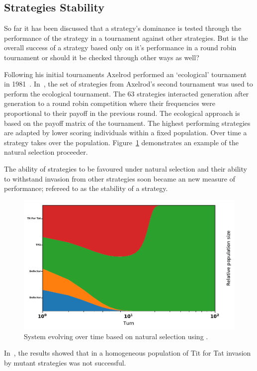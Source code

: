 \documentclass{article}
\begin{document}
\subsection{Strategies Stability}

So far it has been discussed that a strategy's dominance is tested through
the performance of the strategy in a tournament against other strategies.
But is the overall success of a strategy based only on it's performance in a 
round robin tournament or should it be checked through other ways as well?

Following his initial tournaments Axelrod performed an `ecological' tournament
in 1981~\cite{Axelrod1984}. In~\cite{Axelrod1984}, the set of strategies from 
Axelrod's second tournament was used to perform the ecological tournament. The 
63 strategies interacted generation after generation to a round robin competition
where their frequencies were proportional to their payoff in the previous round.
The ecological approach is based on the payoff matrix of the tournament. The
highest performing strategies are adapted by lower scoring individuals
within a fixed population. Over time a strategy takes over the population.
Figure~\ref{fig:ecological.tournament} demonstrates an example of the
natural selection proceeder.

The ability of strategies to be favoured under natural selection and their 
ability to withstand invasion from other strategies soon became an new measure 
of performance; refereed to as the stability of a strategy.

\begin{figure}[!hbtp]
    \centering
    \includegraphics[width=.6\textwidth]{./assets/images/ecological.pdf}
    \caption{System evolving over time based on natural selection using
    \cite{axelrodproject}.}
    \label{fig:ecological.tournament}
\end{figure}

In~\cite{Axelrod1981}, the results showed that in a homogeneous
population of Tit for Tat invasion by mutant strategies was not successful.
\end{document}
